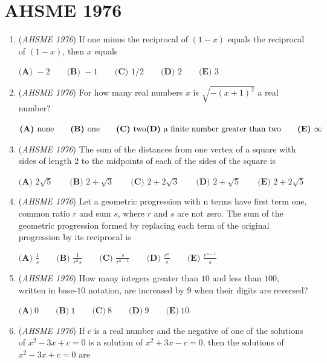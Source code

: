 \section{AHSME 1976}
        \begin{enumerate}
        	\item (\textit{AHSME 1976}) If one minus the reciprocal of $(1-x)$ equals the reciprocal of $(1-x)$, then $x$ equals


 $\textbf{(A) }-2\qquad \textbf{(B) }-1\qquad \textbf{(C) }1/2\qquad \textbf{(D) }2\qquad  \textbf{(E) }3$


	\item (\textit{AHSME 1976}) For how many real numbers $x$ is $\sqrt{-(x+1)^2}$ a real number?


 $\textbf{(A) }\text{none}\qquad \textbf{(B) }\text{one}\qquad \textbf{(C) }\text{two}\qquad\\ \textbf{(D) }\text{a finite number greater than two}\qquad \textbf{(E) }\infty$


	\item (\textit{AHSME 1976}) The sum of the distances from one vertex of a square with sides of length $2$ to the midpoints of each of the sides of the square is


 $\textbf{(A) }2\sqrt{5}\qquad \textbf{(B) }2+\sqrt{3}\qquad \textbf{(C) }2+2\sqrt{3}\qquad \textbf{(D) }2+\sqrt{5}\qquad \textbf{(E) }2+2\sqrt{5}$


	\item (\textit{AHSME 1976}) Let a geometric progression with n terms have first term one, common ratio $r$ and sum $s$, where $r$ and $s$ are not zero. 
The sum of the geometric progression formed by replacing each term of the original progression by its reciprocal is


 $\textbf{(A) }\frac{1}{s}\qquad \textbf{(B) }\frac{1}{r^ns}\qquad \textbf{(C) }\frac{s}{r^{n-1}}\qquad \textbf{(D) }\frac{r^n}{s}\qquad \textbf{(E) } \frac{r^{n-1}}{s}$


	\item (\textit{AHSME 1976}) How many integers greater than $10$ and less than $100$, written in base-$10$ notation, 
are increased by $9$ when their digits are reversed?


 $\textbf{(A)}\ 0 \qquad \textbf{(B)}\ 1 \qquad \textbf{(C)}\ 8 \qquad \textbf{(D)}\ 9 \qquad \textbf{(E)}\ 10$


	\item (\textit{AHSME 1976}) If $c$ is a real number and the negative of one of the solutions of $x^2-3x+c=0$ is a solution of $x^2+3x-c=0$, then the solutions of $x^2-3x+c=0$ are



\end{enumerate}
